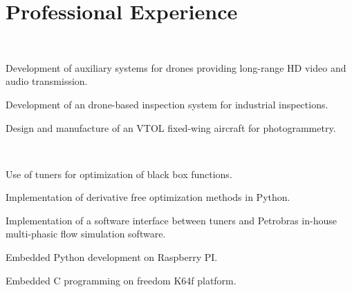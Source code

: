 \documentclass[A4]{deedy-resume} %
\begin{document}
\begin{minipage}[t]{0.66\textwidth} %



\section{Professional Experience}

\\
\vspace{\topsep}
\begin{tightitemize}
 \item Development of auxiliary systems for drones providing long-range HD video and audio transmission.
 \item Development of an drone-based inspection system for industrial inspections.
 \item Design and manufacture of an VTOL fixed-wing aircraft for photogrammetry.
\end{tightitemize}
\sectionspace %

\\

\begin{tightitemize}
 \item Use of tuners for optimization of black box functions.
 \item Implementation of derivative free optimization methods in Python.
 \item Implementation of a software interface between tuners and Petrobras in-house multi-phasic flow simulation software.

\end{tightitemize}

\sectionspace %

\vspace{\topsep} %
\begin{tightitemize}
 \item Embedded Python development on Raspberry PI.
 \item Embedded C programming on freedom K64f platform.
\end{tightitemize}


\end{minipage}
\end{document}
